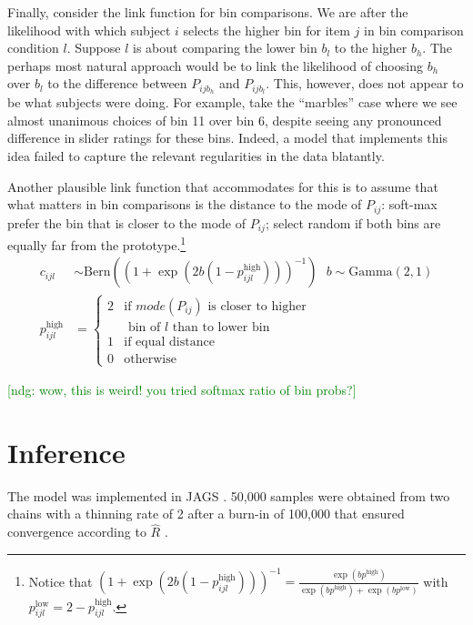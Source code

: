 \documentclass[10pt,letterpaper]{article}
\newcommand{\ndg}[1]{\textcolor{Green}{[ndg: #1]}}
\begin{document}
Finally, consider the link function for bin comparisons. We are after the likelihood with which
subject $i$ selects the higher bin for item $j$ in bin comparison condition $l$. Suppose $l$ is
about comparing the lower bin $b_l$ to the higher $b_h$. The perhaps most natural approach
would be to link the likelihood of choosing $b_h$ over $b_l$ to the difference between
$P_{ijb_h}$ and $P_{ijb_l}$. This, however, does not appear to be what subjects were doing. For
example, take the ``marbles'' case where we see almost unanimous choices of bin 11 over bin 6,
despite seeing any pronounced difference in slider ratings for these bins. Indeed, a model that
implements this idea failed to capture the relevant regularities in the data blatantly.

Another plausible link function that accommodates for this is to assume that what matters in
bin comparisons is the distance to the mode of $P_{ij}$: soft-max prefer the bin that is closer
to the mode of $P_{ij}$; select random if both bins are equally far from the
prototype.\footnote{Notice that
  $(1 + \exp(2b(1-p^{\text{high}}_{ijl})) )^{-1} = \frac{\exp(b p^{\text{high}})}{\exp(b
    p^{\text{high}}) + \exp(b p^{\text{low}})}$
  with $p^\text{low}_{ijl} = 2 - p^\text{high}_{ijl}$.}
\begin{align*}
  c_{ijl} & \sim \text{Bern}( (1 + \exp(2b(1-p^{\text{high}}_{ijl})) )^{-1} ) \ \ \ 
  b  \sim \text{Gamma}(2,1) \\
  p^\text{high}_{ijl} & = \begin{cases}
    2 & \text{if $mode(P_{ij})$ is closer to higher} \\
    & \text{ bin of $l$ than to lower bin } \\ 1 & \text{if equal
      distance} \\ 0 & \text{otherwise}  
  \end{cases}
\end{align*}

\ndg{wow, this is weird! you tried softmax ratio of bin probs?}


\section{Inference}

The model was implemented in JAGS \cite{Plummer2003:JAGS:-A-Program}. 50,000 samples were
obtained from two chains with a thinning rate of 2 after a burn-in of 100,000 that ensured
convergence according to $\hat{R}$ \cite{GelmanRubin1992:Inference-from-}.
\end{document}
